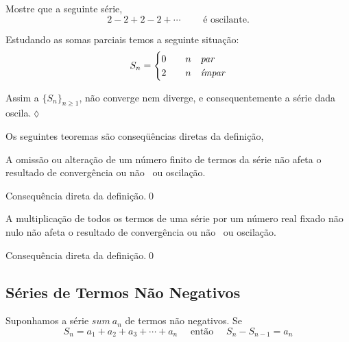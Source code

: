 \begin{exer}
Mostre que a seguinte s\'{e}rie,
\begin{equation*}
2-2+2-2+\cdots \qquad \text{ \'{e} oscilante.}
\end{equation*}
\end{exer}

\solo Estudando as somas parciais temos a seguinte situa\c{c}\~{a}o:
\begin{equation*}
  S_n=
  \begin{cases}
    0 &\quad n \quad \textit{par} \\
    2 &\quad n \quad \textit{\'{\i}mpar}
  \end{cases}
\end{equation*}

Assim a \seq $\{S_n\}_{n\geq 1}$, n\~{a}o converge nem diverge, e
consequentemente a s\'{e}rie dada oscila.\hfill \(\lozenge\)

Os seguintes teoremas s\~{a}o conseq\"u\^{e}ncias diretas da defini\c{c}\~{a}o,

\begin{theoc}{}{}
A omiss\~{a}o ou altera\c{c}\~{a}o de um n\'{u}mero finito de termos da s\'{e}rie n\~{a}o
afeta o resultado de converg\^{e}ncia ou n\~{a}o \conver\ ou oscila\c{c}\~{a}o.
\end{theoc}{}{}

\begin{prvc}{}{}
Consequ\^{e}ncia direta da defini\c{c}\~{a}o.\qed  
\end{prvc}

\begin{theoc}{}{}
A multiplica\c{c}\~{a}o de todos os termos de uma s\'{e}rie por um n\'{u}mero real fixado n\~{a}o nulo  n\~{a}o afeta o resultado de converg\^{e}ncia ou n\~{a}o \conver\ ou oscila\c{c}\~{a}o.
\end{theoc}

\begin{prvc}{}{}
Consequ\^{e}ncia direta da defini\c{c}\~{a}o.\qed  
\end{prvc}


\subsection{S\'{e}ries de Termos N\~{a}o Negativos}
Suponhamos a s\'{e}rie $sum_{}\, a_{n}$ de termos n\~{a}o
negativos. Se
\begin{equation*}
  S_n =a_1+a_2+a_3+\cdots+a_n
  \quad\text{ ent\~{a}o }\quad
   S_n-S_{n-1}=a_n
\end{equation*}

